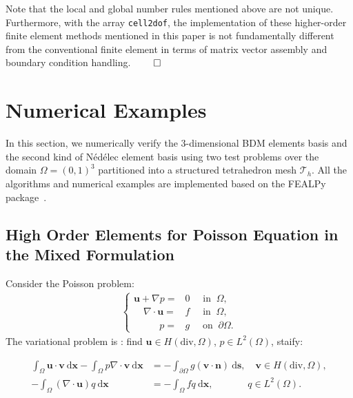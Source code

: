 \documentclass[mathpazo]{cicp}
\begin{document}
\begin{remark}\rm 
  Note that the local and global number rules  mentioned above are not unique.
  Furthermore, with the array \lstinline{cell2dof}, the implementation of these higher-order
  finite element methods mentioned in this paper is not fundamentally different
  from the conventional finite element in terms of matrix vector assembly and
  boundary condition handling. $\qed$
\end{remark}


\section{Numerical Examples}\label{sec:numerexamples}

In this section, we numerically verify the 3-dimensional BDM elements basis and the second kind
of N\'ed\'elec element basis using two test problems over the domain $\Omega =
(0, 1)^3$ partitioned into a structured tetrahedron mesh $\mathcal T_h$. All the algorithms and numerical examples are implemented based on
the FEALPy package~\cite{FEALPy}.



\subsection{High Order Elements for Poisson Equation in the Mixed Formulation}
Consider the Poisson problem:
$$
\begin{aligned}
  \left\{
    \begin{aligned}
      \boldsymbol u + \nabla p ={}& 0 \quad \text{ in } \ \Omega,\\
      \quad \nabla \cdot \boldsymbol u ={}& f\quad \text{ in } \ \Omega,\\
      \quad \quad \ \ \  p ={}& g \quad \text{ on } \ \partial \Omega.
    \end{aligned}
  \right.
\end{aligned}
$$
The variational problem is : find 
$\boldsymbol u \in H(\mathrm{div}, \Omega)$, $p \in L^2(\Omega)$, staify:

\begin{align*}
  \int_{\Omega} \boldsymbol u \cdot \boldsymbol v \ \mathrm d\boldsymbol x -
  \int_{\Omega} p\nabla \cdot \boldsymbol v \ \mathrm d\boldsymbol x & =
  -\int_{\partial \Omega} g(\boldsymbol v \cdot \boldsymbol n) \
  \mathrm d\boldsymbol s, \quad \boldsymbol v \in H(\mathrm{div}, \Omega),\\
  -\int_{\Omega} (\nabla \cdot \boldsymbol u) q \ \mathrm d\boldsymbol x & =
  -\int_{\Omega} fq \ \mathrm d\boldsymbol x, \qquad\quad\;\;  q \in L^2(\Omega).
\end{align*}
\end{document}
